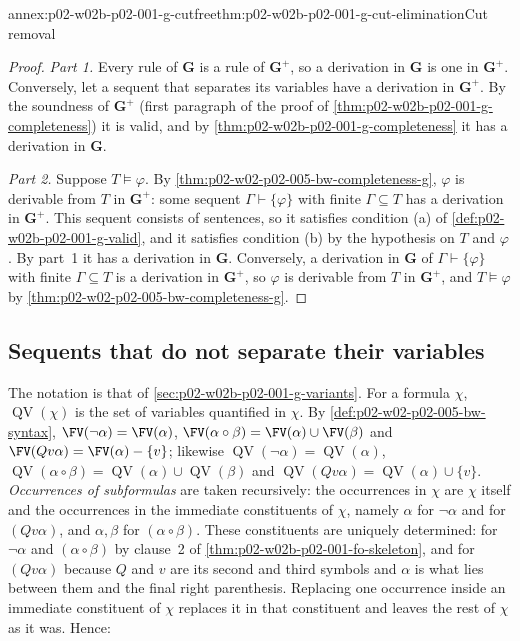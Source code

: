 \begin{annexitem}{annex:p02-w02b-p02-001-g-cutfree}{thm:p02-w02b-p02-001-g-cut-elimination}{Cut removal}
\begin{proof}
\emph{Part 1.}  Every rule of \(\mathbf G\) is a rule of \(\mathbf G^{+}\),
so a derivation in \(\mathbf G\) is one in \(\mathbf G^{+}\).  Conversely,
let a sequent that separates its variables have a derivation in
\(\mathbf G^{+}\).  By the soundness of \(\mathbf G^{+}\) (first paragraph
of the proof of \cref{thm:p02-w02b-p02-001-g-completeness}) it is valid,
and by \cref{thm:p02-w02b-p02-001-g-completeness} it has a derivation in
\(\mathbf G\).

\emph{Part 2.}  Suppose \(T\models\varphi\).  By
\cref{thm:p02-w02-p02-005-bw-completeness-g}, \(\varphi\) is derivable from
\(T\) in \(\mathbf G^{+}\): some sequent \(\Gamma\vdash\{\varphi\}\) with
finite \(\Gamma\subseteq T\) has a derivation in \(\mathbf G^{+}\).  This
sequent consists of sentences, so it satisfies condition (a) of
\cref{def:p02-w02b-p02-001-g-valid}, and it satisfies condition (b) by the
hypothesis on \(T\) and \(\varphi\).  By part~1 it has a derivation in
\(\mathbf G\).  Conversely, a derivation in \(\mathbf G\) of
\(\Gamma\vdash\{\varphi\}\) with finite \(\Gamma\subseteq T\) is a
derivation in \(\mathbf G^{+}\), so \(\varphi\) is derivable from \(T\) in
\(\mathbf G^{+}\), and \(T\models\varphi\) by
\cref{thm:p02-w02-p02-005-bw-completeness-g}.
\end{proof}
\end{annexitem}

\subsection{Sequents that do not separate their variables}
\label{sec:annex-p02-w02b-p02-001-g-variants}

The notation is that of \cref{sec:p02-w02b-p02-001-g-variants}.  For a
formula \(\chi\), \(\operatorname{QV}(\chi)\) is the set of variables
quantified in \(\chi\).  By \cref{def:p02-w02-p02-005-bw-syntax},
\(\FV(\neg\alpha)=\FV(\alpha)\),
\(\FV(\alpha\circ\beta)=\FV(\alpha)\cup\FV(\beta)\) and
\(\FV(Qv\alpha)=\FV(\alpha)-\{v\}\); likewise
\(\operatorname{QV}(\neg\alpha)=\operatorname{QV}(\alpha)\),
\(\operatorname{QV}(\alpha\circ\beta)=\operatorname{QV}(\alpha)\cup\operatorname{QV}(\beta)\)
and \(\operatorname{QV}(Qv\alpha)=\operatorname{QV}(\alpha)\cup\{v\}\).
\emph{Occurrences of subformulas} are taken recursively: the occurrences in
\(\chi\) are \(\chi\) itself and the occurrences in the immediate
constituents of \(\chi\), namely \(\alpha\) for \(\neg\alpha\) and for
\((Qv\alpha)\), and \(\alpha,\beta\) for \((\alpha\circ\beta)\).  These
constituents are uniquely determined: for \(\neg\alpha\) and
\((\alpha\circ\beta)\) by clause~2 of
\cref{thm:p02-w02b-p02-001-fo-skeleton}, and for \((Qv\alpha)\) because
\(Q\) and \(v\) are its second and third symbols and \(\alpha\) is what
lies between them and the final right parenthesis.  Replacing one
occurrence inside an immediate constituent of \(\chi\) replaces it in that
constituent and leaves the rest of \(\chi\) as it was.  Hence:

